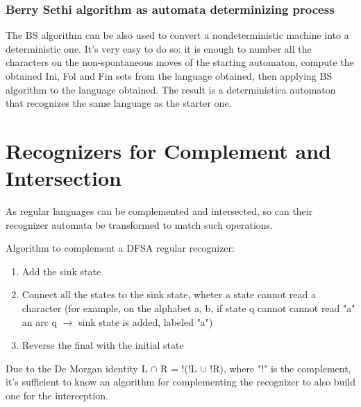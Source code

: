 			\subsubsection{Berry Sethi algorithm as automata determinizing process}
				The BS algorithm can be also used to convert a nondeterministic machine into a deterministic one. It's very easy to do so: it is enough to number 
				all the characters on the non-spontaneous moves of the starting automaton, compute the obtained Ini, Fol and Fin sets from the language obtained, 
				then applying BS algorithm to the language obtained. The result is a deterministica automaton that recognizes the same language as the starter one. 
			
	\section{Recognizers for Complement and Intersection}
		As regular languages can be complemented and intersected, so can their recognizer automata be transformed to match such operations.

		Algorithm to complement a DFSA regular recognizer:
		\begin{enumerate}
			\item Add the sink state
			\item Connect all the states to the sink state, wheter a state cannot read a character (for example, on the alphabet {a, b}, if state q cannot cannot read
			"a" an arc q $\rightarrow$ sink state is added, labeled "a")
			\item Reverse the final with the initial state
		\end{enumerate}
		
		Due to the De Morgan identity L $\cap$ R = !(!L $\cup$ !R), where "!" is the complement, it's sufficient to know an algorithm for complementing the recognizer
		to also build one for the interception.